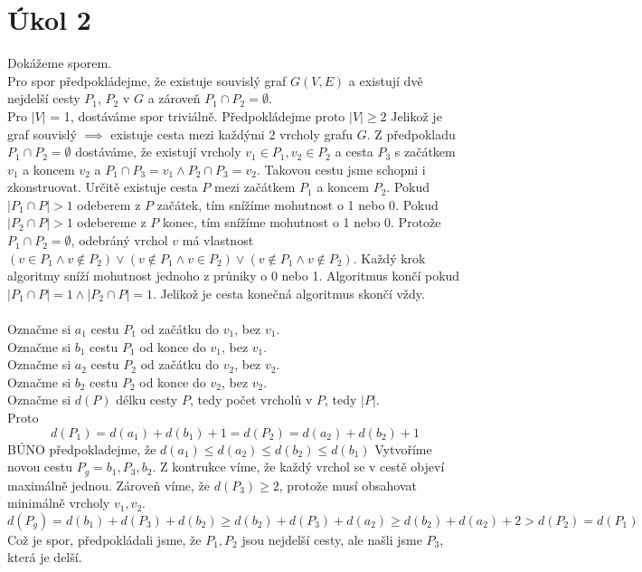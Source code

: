 \documentclass[a4paper]{article}
\begin{document}
\section{Úkol 2}
Dokážeme sporem.
\\
Pro spor předpokládejme, že existuje souvislý graf $G(V,E)$ a existují dvě nejdelší cesty $P_1$, $P_2$ v $G$ a zároveň $P_1 \cap P_2 = \emptyset$.
\\
Pro $|V|$ = 1, dostáváme spor triviálně.
Předpokládejme proto $|V| \ge  2$
Jelikož je graf souvislý $\implies$ existuje cesta mezi každými 2 vrcholy grafu $G$. Z předpokladu $P_1 \cap P_2 = \emptyset$
dostáváme, že existují vrcholy $v_1 \in P_1, v_2 \in P_2$ a cesta $P_3$ s začátkem $v_1$ a koncem $v_2$
a $P_1 \cap P_3 = v_1 \wedge P_2 \cap P_3 = v_2$. Takovou cestu jsme schopni i zkonstruovat. Určitě existuje cesta $P$ mezi začátkem $P_1$ a koncem $P_2$. Pokud $|P_1 \cap P| > 1$ odeberem z $P$ začátek, tím snížíme mohutnost o 1 nebo 0.
Pokud $|P_2 \cap P| > 1$ odebereme z $P$ konec, tím snížíme mohutnost o 1 nebo 0. Protože $P_1 \cap P_2 = \emptyset$, odebráný vrchol $v$ má vlastnost $(v \in P_1 \wedge v \notin P_2) \vee (v \notin P_1 \wedge v \in P_2) \vee (v \notin P_1 \wedge v \notin  P_2)$.
Každý krok algoritmy sníží mohutnost jednoho z průniky o 0 nebo 1. Algoritmus končí pokud  $|P_1 \cap P| = 1 \wedge |P_2 \cap P| = 1$. Jelikož je cesta konečná algoritmus skončí vždy.
\\
\\
Označme si $a_1$ cestu $P_1$ od začátku do $v_1$, bez $v_1$.\\
Označme si $b_1$ cestu $P_1$ od konce do $v_1$, bez $v_1$.\\
Označme si $a_2$ cestu $P_2$ od začátku do $v_2$, bez $v_2$.\\
Označme si $b_2$ cestu $P_2$ od konce do $v_2$, bez $v_2$.\\
Označme si $d(P)$ délku cesty $P$, tedy počet vrcholů v $P$, tedy $|P|$.\\
Proto 
\begin{equation*}
    d(P_1) = d(a_1) + d(b_1) + 1 = d(P_2) = d(a_2) + d(b_2) + 1
\end{equation*}
BÚNO předpokladejme, že $d(a_1) \le d(a_2) \le  d(b_2) \le d(b_1)$
Vytvoříme novou cestu $P_g = b_1, P_3, b_2$. Z kontrukce víme, že každý vrchol se v cestě objeví maximálně jednou.
Zároveň víme, že $d(P_3) \ge  2$, protože musí obsahovat minimálně vrcholy $v_1,v_2$.
\begin{equation*}
    d(P_g) = d(b_1) + d(P_3) + d(b_2) \ge d(b_2) + d(P_3) + d(a_2) \ge d(b_2) + d(a_2) + 2 > d(P_2) = d(P_1)
\end{equation*}
Což je spor, předpokládali jsme, že $P_1,P_2$ jsou nejdelší cesty, ale našli jsme $P_3$, která je delší.
\end{document}
